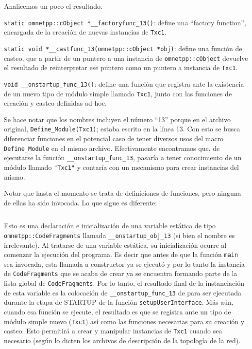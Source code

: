 \inputminted{c++}{codelistings/define_module_3.cc}

Analicemos un poco el resultado.

\verb!static omnetpp::cObject *__factoryfunc_13()!: define una ``factory
function'', encargada de la creación de nuevas instancias de \verb!Txc1!.

\verb!static void *__castfunc_13(omnetpp::cObject *obj)!: define una función de
casteo, que a partir de un puntero a una instancia de \verb!omnetpp::cObject!
devuelve el resultado de reinterpretar ese puntero como un puntero a instancia
de \verb!Txc1!.

\verb!void __onstartup_func_13()!: define una función que registra ante \omnetpp{}
la existencia de un nuevo tipo de módulo simple llamado \verb!Txc1!, junto con
las funciones de creación y casteo definidas ad hoc.

Se hace notar que los nombres incluyen el número ``13'' porque en el archivo
original, \verb!Define_Module(Txc1)!; estaba escrito en la línea 13. Con esto
se busca diferenciar funciones en el potencial caso de tener diversos usos del
macro \verb!Define_Module! en el mismo archivo. Efectivamente encontramos que,
de ejecutarse la función \verb!__onstartup_func_13!, \omnetpp{} pasaría a tener
conocimiento de un módulo llamado \verb!"Txc1"! y contaría con un mecanismo
para crear instancias del mismo.

Notar que hasta el momento se trata de definiciones de funciones, pero ninguna
de ellas ha sido invocada. Lo que sigue es diferente:

\inputminted{c++}{codelistings/define_module_4.cc}

Esto es una declaración e inicialización de una variable estática de tipo
\verb!omnetpp::CodeFragments! llamada \verb!__onstartup_obj_13! (si bien el
nombre es irrelevante). Al tratarse de una variable estática, su inicialización
ocurre al comenzar la ejecución del programa. Es decir que antes de que la
función \verb!main! sea invocada, esta llamada a constructor ya se ejecutó y
por lo tanto la instancia de \verb!CodeFragments! que se acaba de crear ya se
encuentra formando parte de la lista global de \verb!CodeFragments!. Por lo
tanto, el resultado final de la instanciación de esta variable es la colocación
de \verb!__onstartup_func_13!  de para ser ejecutada durante la etapa de
STARTUP de la función \verb!setupUserInterface!. Más aún, cuando esa función se
ejecute, el resultado es que se registra ante \omnetpp{} un tipo de módulo
simple nuevo (\verb!Txc1!) así como las funciones necesarias para su creación y
casteo. Esto permitirá a \omnetpp{} crear y manipular instancias de \verb!Txc1!
cuando sea necesario (según lo dicten los archivos de descripción de la
topología de la red).


